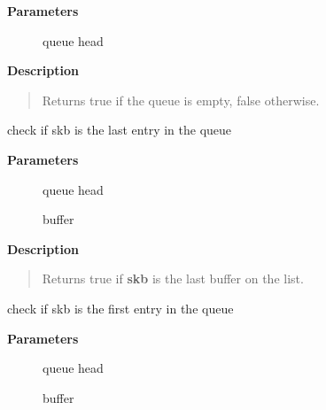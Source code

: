 \documentclass[a4paper,8pt,english]{sphinxmanual}
\begin{document}
\textbf{Parameters}
\begin{description}
\item[{}] \leavevmode
queue head

\end{description}

\textbf{Description}
\begin{quote}

Returns true if the queue is empty, false otherwise.
\end{quote}

\begin{fulllineitems}
\label{networking/kapi:c.skb_queue_is_last}
check if skb is the last entry in the queue

\end{fulllineitems}


\textbf{Parameters}
\begin{description}
\item[{}] \leavevmode
queue head

\item[{}] \leavevmode
buffer

\end{description}

\textbf{Description}
\begin{quote}

Returns true if \textbf{skb} is the last buffer on the list.
\end{quote}

\begin{fulllineitems}
\label{networking/kapi:c.skb_queue_is_first}
check if skb is the first entry in the queue

\end{fulllineitems}


\textbf{Parameters}
\begin{description}
\item[{}] \leavevmode
queue head

\item[{}] \leavevmode
buffer

\end{description}
\end{document}

